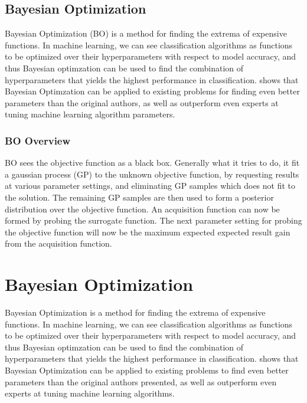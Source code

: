 \subsection{Bayesian Optimization}\label{sec:bayesianoptimization}
Bayesian Optimization (BO) is a method for finding the extrema of expensive functions. In machine learning, we can see classification algorithms as functions to be optimized over their hyperparameters with respect to model accuracy, and thus Bayesian optimzation can be used to find the combination of hyperparameters that yields the highest performance in classification. \citet{snoek2012practical} shows that Bayesian Optimzation can be applied to existing problems for finding even better parameters than the original authors, as well as outperform even experts at tuning machine learning algorithm parameters.  


\subsubsection{BO Overview}
BO sees the objective function as a black box. Generally what it tries to do, it fit a gaussian process (GP) to the unknown objective function, by requesting results at various parameter settings, and eliminating GP samples which does not fit to the solution. The remaining GP samples are then used to form a posterior distribution over the objective function. An acquisition function can now be formed by probing the surrogate function. The next parameter setting for probing the objective function will now be the maximum expected expected result gain from the acquisition function.


\section{Bayesian Optimization}\label{sec:bayesian-optimization}
Bayesian Optimization is a method for finding the extrema of expensive functions. In machine learning, we can see classification algorithms as functions to be optimized over their hyperparameters with respect to model accuracy, and thus Bayesian optimzation can be used to find the combination of hyperparameters that yields the highest performance in classification. \citet{snoek2012practical} shows that Bayesian Optimization can be applied to existing problems to find even better parameters than the original authors presented, as well as outperform even experts at tuning machine learning algorithms. 

